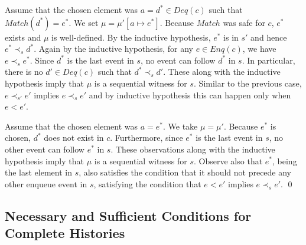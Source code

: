 \documentclass{LMCS}
\newcommand{\Match}{\ensuremath{\mathit{Match}}}
\newcommand{\Deq}[1]{\ensuremath{\mathit{Deq}({#1})}}
\newcommand{\Enq}[1]{\ensuremath{\mathit{Enq}({#1})}}
\begin{document}
Assume that the chosen element was $a=d^*\in \Deq c$ such that $\Match(d^*)=e^*$. 
We set $\mu=\mu'[a\mapsto e^*]$.
Because $\Match$ was safe for $c$, $e^*$ exists and $\mu$ is well-defined.
By the inductive hypothesis, $e^*$ is in $s'$ and hence $e^*\prec_s d^*$.
Again by the inductive hypothesis, for any $e\in \Enq c$, we have $e\prec_s e^*$.
Since $d^*$ is the last event in $s$, no event can follow $d^*$ in $s$.
In particular, there is no $d'\in \Deq c$ such that $d^*\prec_s d'$. 
These along with the inductive hypothesis imply that $\mu$ is a sequential witness for $s$.
Similar to the previous case, $e\prec_{s'} e'$ implies $e\prec_s e'$ and by inductive hypothesis this can happen only when $e<e'$.

Assume that the chosen element was $a=e^*$.
We take $\mu=\mu'$.
Because $e^*$ is chosen, $d^*$ does not exist in $c$.
Furthermore, since $e^*$ is the last event in $s$, no other event can follow $e^*$ in $s$.
These observations along with the inductive hypothesis imply that $\mu$ is a sequential witness for $s$.
Observe also that $e^*$, being the last element in $s$, also satisfies the condition that it should not precede any other enqueue event in $s$, satisfying the condition that $e<e'$ implies $e\prec_s e'$.
\qed


\subsection*{Necessary and Sufficient Conditions for Complete Histories}
\end{document}
